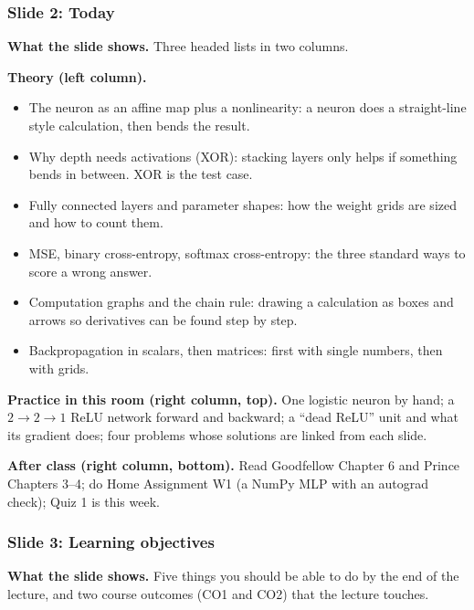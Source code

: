 \subsubsection{Slide 2: Today}

\textbf{What the slide shows.} Three headed lists in two columns.

\textbf{Theory (left column).}
\begin{itemize}
\item The neuron as an affine map plus a nonlinearity: a neuron does a straight-line style calculation, then bends the result.
\item Why depth needs activations (XOR): stacking layers only helps if something bends in between. XOR is the test case.
\item Fully connected layers and parameter shapes: how the weight grids are sized and how to count them.
\item MSE, binary cross-entropy, softmax cross-entropy: the three standard ways to score a wrong answer.
\item Computation graphs and the chain rule: drawing a calculation as boxes and arrows so derivatives can be found step by step.
\item Backpropagation in scalars, then matrices: first with single numbers, then with grids.
\end{itemize}

\textbf{Practice in this room (right column, top).} One logistic neuron by hand; a $2\to2\to1$ ReLU network forward and backward; a ``dead ReLU'' unit and what its gradient does; four problems whose solutions are linked from each slide.

\textbf{After class (right column, bottom).} Read Goodfellow Chapter 6 and Prince Chapters 3--4; do Home Assignment W1 (a NumPy MLP with an autograd check); Quiz 1 is this week.

\subsubsection{Slide 3: Learning objectives}

\textbf{What the slide shows.} Five things you should be able to do by the end of the lecture, and two course outcomes (CO1 and CO2) that the lecture touches.

